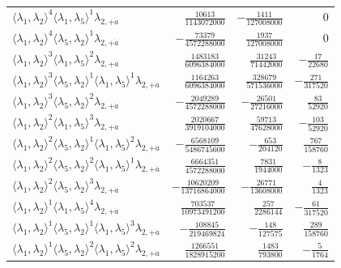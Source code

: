 \begin{longtable}{@{}lrrr@{}}
$\langle\lambda_1,\lambda_2\rangle^{4}\langle\lambda_1,\lambda_5\rangle^{1}\lambda_{2,+\dot a}$ & $\frac{10613}{1143072000}$ & $-\frac{1411}{127008000}$ & $0$ \\
$\langle\lambda_1,\lambda_2\rangle^{4}\langle\lambda_5,\lambda_2\rangle^{1}\lambda_{2,+\dot a}$ & $-\frac{73379}{4572288000}$ & $\frac{1937}{127008000}$ & $0$ \\
$\langle\lambda_1,\lambda_2\rangle^{3}\langle\lambda_1,\lambda_5\rangle^{2}\lambda_{2,+\dot a}$ & $\frac{1483183}{6096384000}$ & $\frac{31243}{71442000}$ & $-\frac{17}{22680}$ \\
$\langle\lambda_1,\lambda_2\rangle^{3}\langle\lambda_5,\lambda_2\rangle^{1}\langle\lambda_1,\lambda_5\rangle^{1}\lambda_{2,+\dot a}$ & $\frac{1164263}{6096384000}$ & $\frac{328679}{571536000}$ & $-\frac{271}{317520}$ \\
$\langle\lambda_1,\lambda_2\rangle^{3}\langle\lambda_5,\lambda_2\rangle^{2}\lambda_{2,+\dot a}$ & $-\frac{2049289}{4572288000}$ & $-\frac{26501}{27216000}$ & $\frac{83}{52920}$ \\
$\langle\lambda_1,\lambda_2\rangle^{2}\langle\lambda_1,\lambda_5\rangle^{3}\lambda_{2,+\dot a}$ & $\frac{2020667}{3919104000}$ & $\frac{59713}{47628000}$ & $-\frac{103}{52920}$ \\
$\langle\lambda_1,\lambda_2\rangle^{2}\langle\lambda_5,\lambda_2\rangle^{1}\langle\lambda_1,\lambda_5\rangle^{2}\lambda_{2,+\dot a}$ & $-\frac{6568109}{5486745600}$ & $-\frac{653}{204120}$ & $\frac{767}{158760}$ \\
$\langle\lambda_1,\lambda_2\rangle^{2}\langle\lambda_5,\lambda_2\rangle^{2}\langle\lambda_1,\lambda_5\rangle^{1}\lambda_{2,+\dot a}$ & $\frac{6664351}{4572288000}$ & $\frac{7831}{1944000}$ & $-\frac{8}{1323}$ \\
$\langle\lambda_1,\lambda_2\rangle^{2}\langle\lambda_5,\lambda_2\rangle^{3}\lambda_{2,+\dot a}$ & $-\frac{10620209}{13716864000}$ & $-\frac{26771}{13608000}$ & $\frac{4}{1323}$ \\
$\langle\lambda_1,\lambda_2\rangle^{1}\langle\lambda_1,\lambda_5\rangle^{4}\lambda_{2,+\dot a}$ & $\frac{703537}{10973491200}$ & $\frac{257}{2286144}$ & $-\frac{61}{317520}$ \\
$\langle\lambda_1,\lambda_2\rangle^{1}\langle\lambda_5,\lambda_2\rangle^{1}\langle\lambda_1,\lambda_5\rangle^{3}\lambda_{2,+\dot a}$ & $-\frac{108845}{219469824}$ & $-\frac{148}{127575}$ & $\frac{289}{158760}$ \\
$\langle\lambda_1,\lambda_2\rangle^{1}\langle\lambda_5,\lambda_2\rangle^{2}\langle\lambda_1,\lambda_5\rangle^{2}\lambda_{2,+\dot a}$ & $\frac{1266551}{1828915200}$ & $\frac{1483}{793800}$ & $-\frac{5}{1764}$ \\

\end{longtable}
